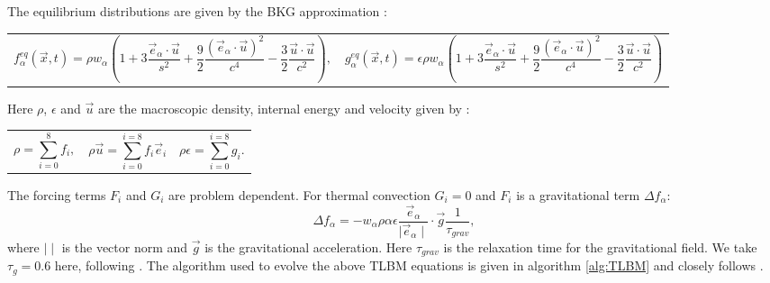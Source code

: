 \documentclass{article}
\begin{document}
The equilibrium distributions are given by the BKG approximation \cite{qian1992lattice}:
\newline
\begin{tabularx}{\textwidth}{XX}
\begin{equation}
	f^{eq}_{\alpha}(\vec{x}, t)  = \rho w_{\alpha} (1 + 3 \frac{\vec{e}_{\alpha} \cdot \vec{u}}{s^2} + \frac{9}{2} \frac{(\vec{e}_{\alpha} \cdot \vec{u}  )^2}{c^4} - \frac{3}{2} \frac{\vec{u} \cdot \vec{u}}{c^2}  ),
\end{equation}
    &
\begin{equation}
	g^{eq}_{\alpha}(\vec{x}, t)  = \epsilon \rho w_{\alpha} (1 + 3 \frac{\vec{e}_{\alpha} \cdot \vec{u}}{s^2} + \frac{9}{2} \frac{(\vec{e}_{\alpha} \cdot \vec{u}  )^2}{c^4} - \frac{3}{2} \frac{\vec{u} \cdot \vec{u}}{c^2}  )
\end{equation}
\end{tabularx}\par

Here $\rho$, $\epsilon$ and $\vec{u}$ are the macroscopic density, internal energy and velocity given by \cite{mora2017simulation}:

\begin{tabularx}{\textwidth}{XXX}
\begin{equation}
	\rho = \sum_{i=0}^{8} f_{i},
	\label{LBM rho}
\end{equation}
    &
\begin{equation}
	\rho \vec{u} = \sum_{i=0}^{i=8} f_{i} \vec{e}_{i}
	\label{LBM u}
\end{equation}
	&
\begin{equation}
	\rho \epsilon = \sum_{i=0}^{i=8} g_{i}.
	\label{LBM ep}
\end{equation}
\end{tabularx}\par

The forcing terms $F_i$ and $G_i$ are problem dependent. For thermal convection $G_i=0$ and $F_i$ is a gravitational term ${\Delta f}_{\alpha}$:
\begin{equation}
	{\Delta f}_{\alpha} = - w_{\alpha} \rho \alpha \epsilon \frac{\vec{e}_{\alpha}}{\mid \vec{e}_{\alpha} \mid} \cdot \vec{g} \frac{1}{\tau_{grav}},
\end{equation}
where $\mid \mid$ is the vector norm and $\vec{g}$ is the gravitational acceleration. Here $\tau_{grav}$ is the relaxation time for the gravitational field. We take $\tau_g=0.6$ here, following \cite{mora2017simulation}. The algorithm used to evolve the above TLBM equations is given in algorithm \ref{alg:TLBM} and closely follows \cite{mora2017simulation}.
\end{document}
